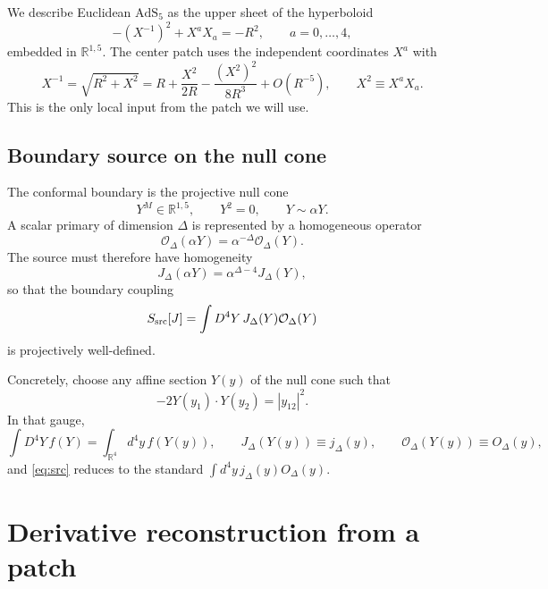 \documentclass[11pt]{article}
\newcommand{\AdS}{\mathrm{AdS}_5}
\newcommand{\OO}{\mathcal{O}}
\begin{document}
We describe Euclidean $\AdS$ as the upper sheet of the hyperboloid
\begin{equation}
-(X^{-1})^2+X^aX_a=-R^2,\qquad a=0,\dots,4,
\label{eq:hyper}
\end{equation}
embedded in $\mathbb{R}^{1,5}$. The center patch uses the independent coordinates $X^a$ with
\begin{equation}
X^{-1}=\sqrt{R^2+X^2}
=
R+\frac{X^2}{2R}-\frac{(X^2)^2}{8R^3}+O(R^{-5}),
\qquad X^2\equiv X^aX_a.
\label{eq:xminus}
\end{equation}
This is the only local input from the patch we will use.

\subsection{Boundary source on the null cone}

The conformal boundary is the projective null cone
\begin{equation}
Y^M\in\mathbb{R}^{1,5},
\qquad
Y^2=0,
\qquad
Y\sim \alpha Y.
\end{equation}
A scalar primary of dimension $\Delta$ is represented by a homogeneous operator
\begin{equation}
\OO_\Delta(\alpha Y)=\alpha^{-\Delta}\OO_\Delta(Y).
\end{equation}
The source must therefore have homogeneity
\begin{equation}
J_\Delta(\alpha Y)=\alpha^{\Delta-4}J_\Delta(Y),
\label{eq:Jhom}
\end{equation}
so that the boundary coupling
\begin{equation}
S_{\rm src}[J]
=
\int D^4Y\,J_\Delta(Y)\OO_\Delta(Y)
\label{eq:src}
\end{equation}
is projectively well-defined.

Concretely, choose any affine section $Y(y)$ of the null cone such that
\begin{equation}
-2Y(y_1)\cdot Y(y_2)=|y_{12}|^2.
\label{eq:affine}
\end{equation}
In that gauge,
\begin{equation}
\int D^4Y\,f(Y)=\int_{\mathbb{R}^4}\! d^4y\,f(Y(y)),
\qquad
J_\Delta(Y(y))\equiv j_\Delta(y),
\qquad
\OO_\Delta(Y(y))\equiv O_\Delta(y),
\end{equation}
and \cref{eq:src} reduces to the standard $\int d^4y\,j_\Delta(y)O_\Delta(y)$.

\section{Derivative reconstruction from a patch}
\end{document}
